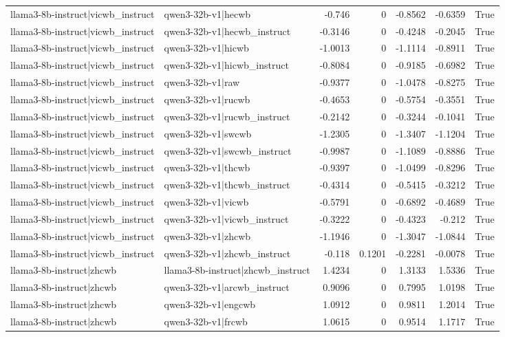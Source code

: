 \begin{table}
\begin{tabular}{l l r r r r l}
llama3-8b-instruct|vicwb_instruct & qwen3-32b-v1|hecwb & -0.746 & 0 & -0.8562 & -0.6359 & True \\
llama3-8b-instruct|vicwb_instruct & qwen3-32b-v1|hecwb_instruct & -0.3146 & 0 & -0.4248 & -0.2045 & True \\
llama3-8b-instruct|vicwb_instruct & qwen3-32b-v1|hicwb & -1.0013 & 0 & -1.1114 & -0.8911 & True \\
llama3-8b-instruct|vicwb_instruct & qwen3-32b-v1|hicwb_instruct & -0.8084 & 0 & -0.9185 & -0.6982 & True \\
llama3-8b-instruct|vicwb_instruct & qwen3-32b-v1|raw & -0.9377 & 0 & -1.0478 & -0.8275 & True \\
llama3-8b-instruct|vicwb_instruct & qwen3-32b-v1|rucwb & -0.4653 & 0 & -0.5754 & -0.3551 & True \\
llama3-8b-instruct|vicwb_instruct & qwen3-32b-v1|rucwb_instruct & -0.2142 & 0 & -0.3244 & -0.1041 & True \\
llama3-8b-instruct|vicwb_instruct & qwen3-32b-v1|swcwb & -1.2305 & 0 & -1.3407 & -1.1204 & True \\
llama3-8b-instruct|vicwb_instruct & qwen3-32b-v1|swcwb_instruct & -0.9987 & 0 & -1.1089 & -0.8886 & True \\
llama3-8b-instruct|vicwb_instruct & qwen3-32b-v1|thcwb & -0.9397 & 0 & -1.0499 & -0.8296 & True \\
llama3-8b-instruct|vicwb_instruct & qwen3-32b-v1|thcwb_instruct & -0.4314 & 0 & -0.5415 & -0.3212 & True \\
llama3-8b-instruct|vicwb_instruct & qwen3-32b-v1|vicwb & -0.5791 & 0 & -0.6892 & -0.4689 & True \\
llama3-8b-instruct|vicwb_instruct & qwen3-32b-v1|vicwb_instruct & -0.3222 & 0 & -0.4323 & -0.212 & True \\
llama3-8b-instruct|vicwb_instruct & qwen3-32b-v1|zhcwb & -1.1946 & 0 & -1.3047 & -1.0844 & True \\
llama3-8b-instruct|vicwb_instruct & qwen3-32b-v1|zhcwb_instruct & -0.118 & 0.1201 & -0.2281 & -0.0078 & True \\
llama3-8b-instruct|zhcwb & llama3-8b-instruct|zhcwb_instruct & 1.4234 & 0 & 1.3133 & 1.5336 & True \\
llama3-8b-instruct|zhcwb & qwen3-32b-v1|arcwb_instruct & 0.9096 & 0 & 0.7995 & 1.0198 & True \\
llama3-8b-instruct|zhcwb & qwen3-32b-v1|engcwb & 1.0912 & 0 & 0.9811 & 1.2014 & True \\
llama3-8b-instruct|zhcwb & qwen3-32b-v1|frcwb & 1.0615 & 0 & 0.9514 & 1.1717 & True \\

\end{tabular}
\end{table}
